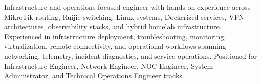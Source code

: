 Infrastructure and operations-focused engineer with hands-on experience across MikroTik routing, Ruijie switching, Linux systems, Dockerized services, VPN architectures, observability stacks, and hybrid homelab infrastructure. Experienced in infrastructure deployment, troubleshooting, monitoring, virtualization, remote connectivity, and operational workflows spanning networking, telemetry, incident diagnostics, and service operations. Positioned for Infrastructure Engineer, Network Engineer, NOC Engineer, System Administrator, and Technical Operations Engineer tracks.

